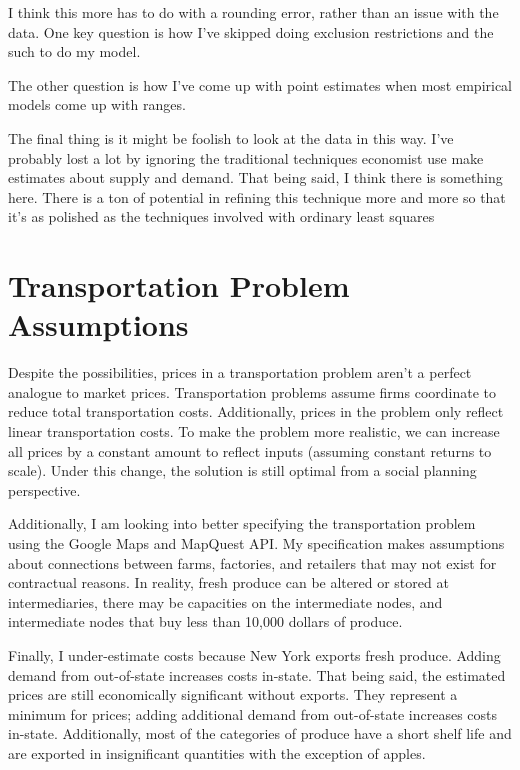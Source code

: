 \documentclass{report}
\begin{document}
I think this more has to do with a rounding error, rather than an issue with the data.
One key question is how I've skipped doing exclusion restrictions and the such to do my model.

The other question is how I've come up with point estimates when most empirical models come up with ranges.

The final thing is it might be foolish to look at the data in this way. I've probably lost a lot by ignoring the traditional techniques economist use make estimates about supply and demand. That being said, I think there is something here. There is a ton of potential in refining this technique more and more so that it's as polished as the techniques involved with ordinary least squares


\section{Transportation Problem Assumptions}

Despite the possibilities, prices in a transportation problem aren't a perfect analogue to market prices. Transportation problems assume firms coordinate to reduce total transportation costs. Additionally, prices in the problem only reflect linear transportation costs. To make the problem more realistic, we can increase all prices by a constant amount to reflect inputs (assuming constant returns to scale). Under this change, the solution is still optimal from a social planning perspective. 

Additionally, I am looking into better specifying the transportation problem using the Google Maps and MapQuest API.  My specification makes assumptions about connections between farms, factories, and retailers that may not exist for contractual reasons. In reality, fresh produce can be altered or stored at intermediaries, there may be capacities on the intermediate nodes, and intermediate nodes that buy less than 10,000 dollars of produce. 

Finally, I under-estimate costs because New York exports fresh produce. Adding demand from out-of-state increases costs in-state.  That being said, the estimated prices are still economically significant without exports. They represent a minimum for prices; adding additional demand from out-of-state increases costs in-state. Additionally, most of the categories of produce have a short shelf life and are exported in insignificant quantities with the exception of apples.
\end{document}
